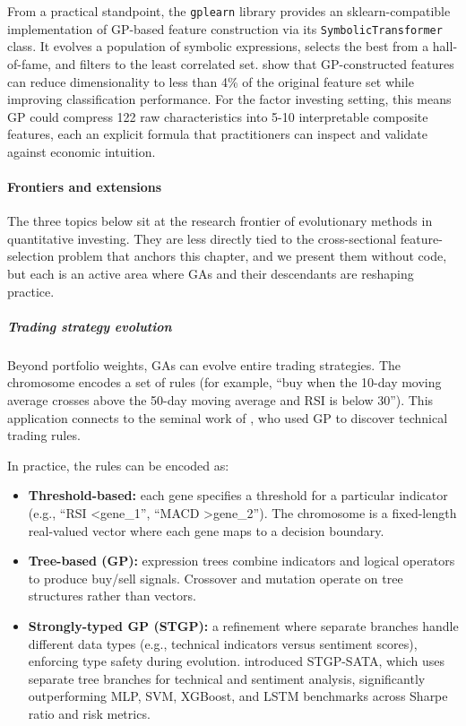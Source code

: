 From a practical standpoint, the \texttt{gplearn} library provides an sklearn-compatible implementation of GP-based feature construction via its \texttt{SymbolicTransformer} class. It evolves a population of symbolic expressions, selects the best from a hall-of-fame, and filters to the least correlated set. \cite{Tran2019} show that GP-constructed features can reduce dimensionality to less than 4\% of the original feature set while improving classification performance. For the factor investing setting, this means GP could compress 122 raw characteristics into 5-10 interpretable composite features, each an explicit formula that practitioners can inspect and validate against economic intuition.

\paragraph{Frontiers and extensions}

The three topics below sit at the research frontier of evolutionary methods in quantitative investing. They are less directly tied to the cross-sectional feature-selection problem that anchors this chapter, and we present them without code, but each is an active area where GAs and their descendants are reshaping practice.

\subparagraph{Trading strategy evolution}

Beyond portfolio weights, GAs can evolve entire trading strategies. The chromosome encodes a set of rules (for example, ``buy when the 10-day moving average crosses above the 50-day moving average and RSI is below 30''). This application connects to the seminal work of \cite{Allen1999}, who used GP to discover technical trading rules.

In practice, the rules can be encoded as:

\begin{itemize}
\item \textbf{Threshold-based:} each gene specifies a threshold for a particular indicator (e.g., ``RSI \textless  gene\_1'', ``MACD \textgreater  gene\_2''). The chromosome is a fixed-length real-valued vector where each gene maps to a decision boundary.
\item \textbf{Tree-based (GP):} expression trees combine indicators and logical operators to produce buy/sell signals. Crossover and mutation operate on tree structures rather than vectors.
\item \textbf{Strongly-typed GP (STGP):} a refinement where separate branches handle different data types (e.g., technical indicators versus sentiment scores), enforcing type safety during evolution. \cite{Christodoulaki2025} introduced STGP-SATA, which uses separate tree branches for technical and sentiment analysis, significantly outperforming MLP, SVM, XGBoost, and LSTM benchmarks across Sharpe ratio and risk metrics.
\end{itemize}

